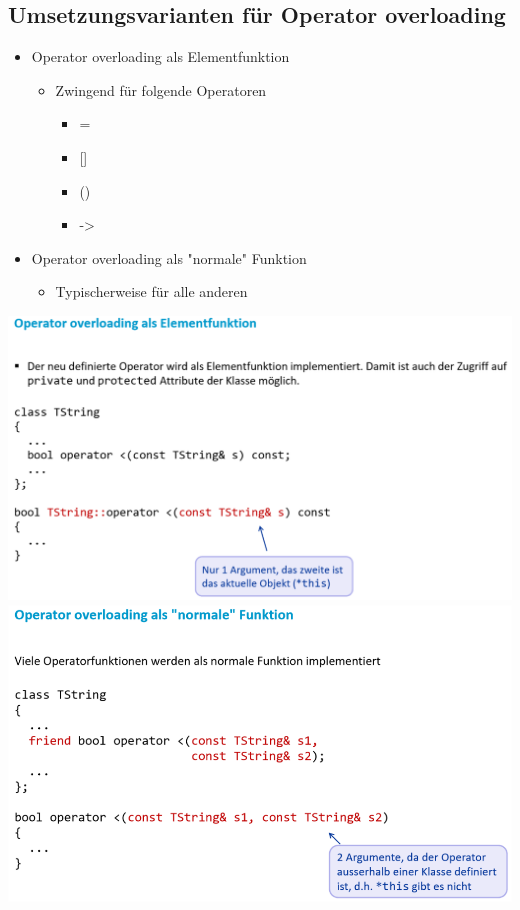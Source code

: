 \subsection{Umsetzungsvarianten für Operator overloading}
\begin{itemize}
	\item Operator overloading als Elementfunktion
	\begin{itemize}
		\item Zwingend für folgende Operatoren
		\begin{itemize}
			\item{} =
			\item {} []
			\item {} ()
			\item {} ->
		\end{itemize}
	\end{itemize}
	\item Operator overloading als "normale"  Funktion
	\begin{itemize}
		\item Typischerweise für alle anderen
	\end{itemize}
\end{itemize}
\begin{multicols}{2}
	\includegraphics[width=\linewidth]{images/operatorOverloading.png}
	\columnbreak
	\includegraphics[width=\linewidth]{images/operatorOverloadingNormaleFunktion.png}
\end{multicols}
